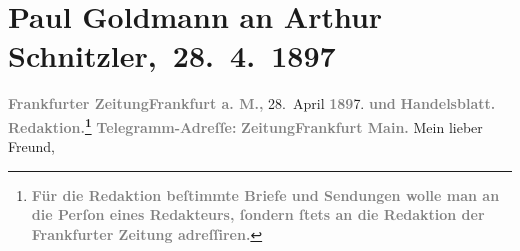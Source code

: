 

         
         \renewcommand{\erwaehntePersonen}{Personen:  ?? [blonder junger Musiker in Paris], Paul Goldmann, Marie Reinhard, Dora Villé}
         \renewcommand{\erwaehnteInstitutionen}{Institutionen: Frankfurter Zeitung}
         \renewcommand{\erwaehnteOrte}{Orte: Berlin, Concert Parisien, Frankfurt am Main, Hotel Deutscher Kaiser, Hôtel de Ville, Panthéon, Paris}
         \renewcommand{\erwaehnteWerke}{}
               \section[ Paul Goldmann an Arthur Schnitzler, 28. 4. 1897]{ Paul Goldmann an Arthur Schnitzler, 28. 4. 1897}\nopagebreak{}\rehead{ }\begin{ledgroupsized}[t]{13cm}\normalsize\beginnumbering{} \toendnotes[C]{\smallbreak\pagebreak[2]} 
\toendnotes[C]{\smallbreak}\pstart
           \noindent{}{\pb}\textcolor{gray}{\textbf{Frankfurter Zeitung}}\hfill \textcolor{gray}{\textbf{Frankfurt a. M.,}}{ }28. April \textcolor{gray}{\textbf{189}}7.\pend
           \pstart
           \textcolor{gray}{\textbf{und}}\pend
           \pstart
           \textcolor{gray}{\textbf{Handelsblatt.}}\pend
           \pstart
           \textcolor{gray}{\textbf{Redaktion.\footnote{\noindent{}\textcolor{gray}{\textbf{Für die Redaktion beſtimmte Briefe und Sendungen wolle man
                                  an die Perſon eines Redakteurs,
                              ſondern ſtets \textbf{an die Redaktion der Frankfurter Zeitung} adreſſiren.}}}}}\pend
           \pstart
           \textcolor{gray}{\textbf{Telegramm-Adreſſe:}}\pend
           \pstart
           \textcolor{gray}{\textbf{ZeitungFrankfurt Main. }}\pend
           \pstart\center{}Mein lieber Freund,\pend\pstart

\end{ledgroupsized}
